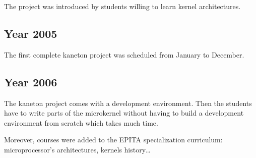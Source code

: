 The  project  was  introduced  by  students willing  to  learn  kernel
architectures.

\subsection*{Year 2005}

The  first complete  kaneton  project was  scheduled  from January  to
December.

\subsection*{Year 2006}

The  kaneton project comes  with a  development environment.  Then the
students  have to  write parts  of the  microkernel without  having to
build a development environment from scratch which takes much time.

Moreover, courses  were added to the  EPITA specialization curriculum:
microprocessor's architectures, kernels history\ldots{}


